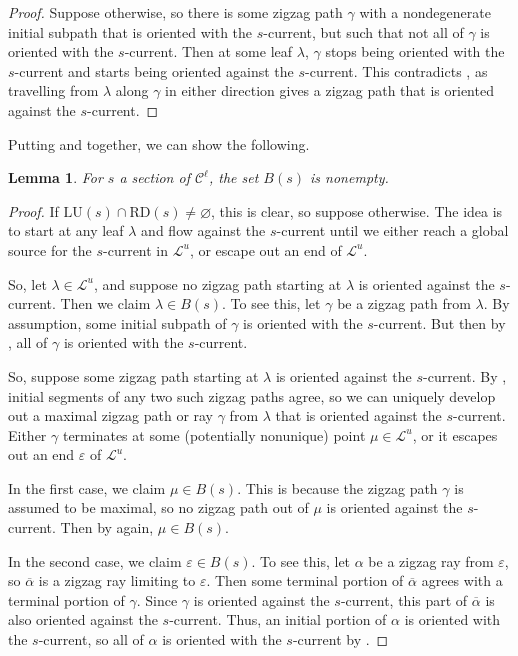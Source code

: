 \documentclass[11pt]{amsart}
\renewcommand{\l}{\lambda}
\newcommand{\mc}{\mathcal}
\newcommand{\lu}{\mathrm{LU}}
\newcommand{\rd}{\mathrm{RD}}
\newcommand{\vep}{\varepsilon}
\numberwithin{equation}{section}
\newtheorem{lemma}[equation]{Lemma}
\theoremstyle{definition}
\begin{document}
\begin{proof}
	Suppose otherwise, so there is some zigzag path $\gamma$ with a nondegenerate initial subpath that is oriented with the $s$-current, but such that not all of $\gamma$ is oriented with the $s$-current. Then at some leaf $\l$, $\gamma$ stops being oriented with the $s$-current and starts being oriented against the $s$-current. This contradicts , as travelling from $\l$ along $\gamma$ in either direction gives a zigzag path that is oriented against the $s$-current.
\end{proof}

Putting  and  together, we can show the following.

\begin{lemma}\label{lem:B_wd}
	For $s$ a section of $\mc C^\ell$, the set $B(s)$ is nonempty.
\end{lemma}

\begin{proof}

	
	If $\lu(s)\cap\rd(s)\neq\varnothing$, this is clear, so suppose otherwise. The idea is to start at any leaf $\l$ and flow against the $s$-current until we either reach a global source for the $s$-current in $\mc L^u$, or escape out an end of $\mc L^u$. 
	
	So, let $\l\in\mc L^u$, and suppose no zigzag path starting at $\l$ is oriented against the $s$-current. Then we claim $\l\in B(s)$. To see this, let $\gamma$ be a zigzag path from $\l$. By assumption, some initial subpath of $\gamma$ is oriented with the $s$-current. But then by , all of $\gamma$ is oriented with the $s$-current.
	
	So, suppose some zigzag path starting at $\l$ is oriented against the $s$-current. By , initial segments of any two such zigzag paths agree, so we can uniquely develop out a maximal zigzag path or ray $\gamma$ from $\l$ that is oriented against the $s$-current. Either $\gamma$ terminates at some (potentially nonunique) point $\mu\in\mc L^u$, or it escapes out an end $\vep$ of $\mc L^u$.
	
	In the first case, we claim $\mu\in B(s)$. This is because the zigzag path $\gamma$ is assumed to be maximal, so no zigzag path out of $\mu$ is oriented against the $s$-current. Then by  again, $\mu\in B(s)$.
	
	In the second case, we claim $\vep\in B(s)$. To see this, let $\alpha$ be a zigzag ray from $\vep$, so $\overline{\alpha}$ is a zigzag ray limiting to $\vep$. Then some terminal portion of $\overline{\alpha}$ agrees with a terminal portion of $\gamma$. Since $\gamma$ is oriented against the $s$-current, this part of $\overline{\alpha}$ is also oriented against the $s$-current. Thus, an initial portion of $\alpha$ is oriented with the $s$-current, so all of $\alpha$ is oriented with the $s$-current by .
\end{proof}
\end{document}
